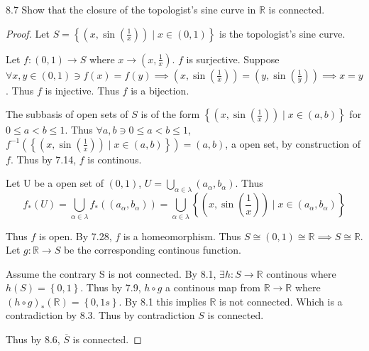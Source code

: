 \documentclass{article}
\newcommand{\R}{\mathbb{R}}
\begin{document}
\bigskip

\begin{PROB}{8.7}\label{Problem 8.7.}
    Show that the closure of the topologist's sine curve in $\R$ is connected.
\end{PROB}
\begin{proof}
    Let $S = \left\{ \left(x, \sin\left(\frac{1}{x}\right)\right) \mid x \in (0, 1)\right\}$ is the topologist's sine curve. 
    
    Let $f: (0, 1) \to S$ where $x \to \left(x, \frac{1}{x}\right)$. $f$ is surjective. Suppose $\forall x, y \in (0, 1) \ni f(x) = f(y) \implies (x, \sin(\frac{1}{x})) = (y, \sin(\frac{1}{y})) \implies x = y$. Thus $f$ is injective. Thus $f$ is a bijection. 

    The subbasis of open sets of $S$ is of the form $\left\{ \left(x, \sin\left(\frac{1}{x}\right)\right) \mid x \in (a, b) \right\}$ for $0 \leq a < b \leq 1$. Thus $\forall a,b \ni 0 \leq a < b \leq 1$, $f^{-1}(\left\{ \left(x, \sin\left(\frac{1}{x}\right)\right) \mid x \in (a, b) \right\}) = (a, b)$, a open set, by construction of $f$. Thus by 7.14, $f$ is continous. 
    
    Let U be a open set of $(0, 1)$, $U = \bigcup_{\alpha \in \lambda}(a_\alpha, b_\alpha)$. Thus \[f_*(U) = \bigcup_{\alpha \in \lambda} f_*((a_\alpha, b_\alpha)) = \bigcup_{\alpha \in \lambda} \left\{ \left(x, \sin\left(\frac{1}{x}\right)\right) \mid x \in (a_\alpha, b_\alpha) \right\}\]
    
    Thus $f$ is open. By 7.28, $f$ is a homeomorphism. Thus $S \cong (0, 1) \cong \R \implies S \cong \R$. Let $g: \R \to S$ be the corresponding continous function.  
    
    Assume the contrary S is not connected. By 8.1, $\exists h: S \to \R$ continous where $h(S) = \left\{ 0, 1 \right\}$. Thus by 7.9, $h \circ g$ a continous map from $\R \to \R$ where $(h \circ g)_*(\R) = \left\{ 0, 1s \right\}$. By 8.1 this implies $\R$ is not connected. Which is a contradiction by 8.3. Thus by contradiction $S$ is connected. 
    
    Thus by 8.6, $\overline{S}$ is connected.  
\end{proof}

\bigskip
\end{document}
